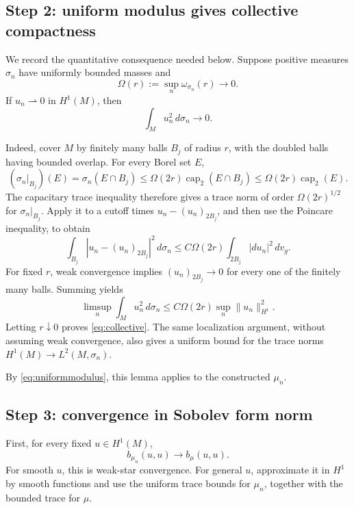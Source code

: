 \documentclass[11pt]{article}
\newcommand{\capc}{\operatorname{cap}_2}
\newcommand{\dv}{\,d v_g}
\begin{document}
\subsection*{Step 2: uniform modulus gives collective compactness}

We record the quantitative consequence needed below. Suppose positive measures
\(\sigma_n\) have uniformly bounded masses and
\begin{equation}\label{eq:familymodulus}
 \Omega(r):=\sup_n\omega_{\sigma_n}(r)\longrightarrow0.
\end{equation}
If \(u_n\rightharpoonup0\) in \(H^1(M)\), then
\begin{equation}\label{eq:collective}
 \int_M u_n^2\,d\sigma_n\longrightarrow0.
\end{equation}

Indeed, cover \(M\) by finitely many balls \(B_j\) of radius \(r\), with the
doubled balls having bounded overlap. For every Borel set \(E\),
\[
 (\sigma_n|_{B_j})(E)
 =\sigma_n(E\cap B_j)
 \leq \Omega(2r)\capc(E\cap B_j)
 \leq \Omega(2r)\capc(E).
\]
The capacitary trace inequality therefore gives a trace norm of order
\(\Omega(2r)^{1/2}\) for \(\sigma_n|_{B_j}\). Apply it to a cutoff times
\(u_n-(u_n)_{2B_j}\), and then use the Poincare inequality, to obtain
\[
 \int_{B_j}|u_n-(u_n)_{2B_j}|^2\,d\sigma_n
 \leq C\Omega(2r)\int_{2B_j}|du_n|^2\dv.
\]
For fixed \(r\), weak convergence implies
\((u_n)_{2B_j}\to0\) for every one of the finitely many balls. Summing yields
\[
 \limsup_n\int_Mu_n^2\,d\sigma_n
 \leq C\Omega(2r)\sup_n\|u_n\|_{H^1}^2.
\]
Letting \(r\downarrow0\) proves \eqref{eq:collective}. The same localization
argument, without assuming weak convergence, also gives a uniform bound for
the trace norms \(H^1(M)\to L^2(M,\sigma_n)\).

By \eqref{eq:uniformmodulus}, this lemma applies to the constructed
\(\mu_n\).

\subsection*{Step 3: convergence in Sobolev form norm}

First, for every fixed \(u\in H^1(M)\),
\begin{equation}\label{eq:fixed}
 b_{\mu_n}(u,u)\longrightarrow b_\mu(u,u).
\end{equation}
For smooth \(u\), this is weak-star convergence. For general \(u\), approximate
it in \(H^1\) by smooth functions and use the uniform trace bounds for
\(\mu_n\), together with the bounded trace for \(\mu\).
\end{document}
